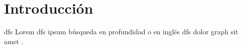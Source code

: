 \section{Introducción}\label{intro}
\acrshort{dfs} Lorem \acrlong{dfs} ipsum búsqueda en profundidad o en inglés \acrfull{dfs} dolor \gls{graph} sit amet \cite{MichaelG.Paciello2000}.